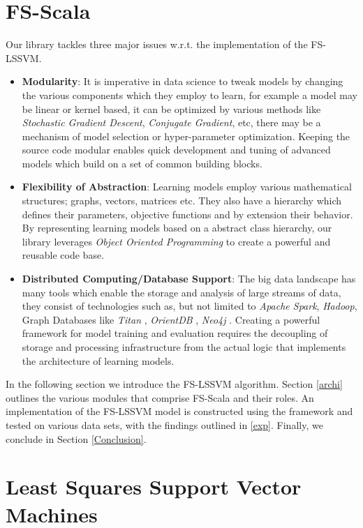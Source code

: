 \documentclass[conference, cmex10]{IEEEtran}
\begin{document}
\section*{FS-Scala}
Our library tackles three major issues w.r.t. the implementation of the FS-LSSVM.

\begin{itemize}
\item \textbf{Modularity}:
It is imperative in data science to tweak models by changing the various components which they employ to learn, for example a model may be linear or kernel based, it can be optimized by various methods like \textit{Stochastic Gradient Descent}, \textit{Conjugate Gradient}, etc, there may be a mechanism of model selection or hyper-parameter optimization. Keeping the source code modular enables quick development and tuning of advanced models which build on a set of common building blocks.
\item \textbf{Flexibility of Abstraction}:
Learning models employ various mathematical structures; graphs, vectors, matrices etc. They also have a hierarchy which defines their parameters, objective functions and by extension their behavior. By representing learning models based on a abstract class hierarchy, our library leverages \textit{Object Oriented Programming} to create a powerful and reusable code base.
\item \textbf{Distributed Computing/Database Support}:
The big data landscape has many tools which enable the storage and analysis of large streams of data, they consist of technologies such as, but not limited to \textit{Apache Spark}, \textit{Hadoop}, Graph Databases like \textit{Titan} \cite{Titan:2014}, \textit{OrientDB} \cite{OrientDB:2010}, \textit{Neo4j} \cite{Neo4j:2010}. Creating a powerful framework for model training and evaluation requires the decoupling of storage and processing infrastructure from the actual logic that implements the architecture of learning models.
\end{itemize}

In the following section we introduce the FS-LSSVM algorithm\cite{DeBrabanter2010}. Section \ref{archi} outlines the various modules that comprise FS-Scala and their roles. An implementation of the FS-LSSVM model is constructed using the framework and tested on various data sets, with the findings outlined in \ref{exp}. Finally, we conclude in Section \ref{Conclusion}.
\section{Least Squares Support Vector Machines}
\end{document}
